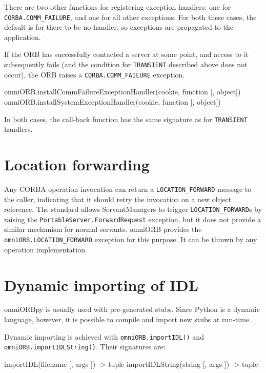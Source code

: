 \documentclass[11pt,oneside,a4paper]{book}
\newcommand{\code}[1]{\texttt{#1}}
\newcommand{\op}[1]{\texttt{#1()}}
\newcommand{\dsc}{\discretionary{}{}{}}
\begin{document}
There are two other functions for registering exception handlers: one
for \code{CORBA.\dsc{}COMM\_FAILURE}, and one for all other
exceptions. For both these cases, the default is for there to be no
handler, so exceptions are propagated to the application.

If the ORB has successfully contacted a server at some point, and
access to it subsequently fails (and the condition for
\code{TRANSIENT} described above does not occur), the ORB raises a
\code{CORBA.COMM\_\dsc{}FAILURE} exception.

\begin{pylisting}
omniORB.installCommFailureExceptionHandler(cookie, function [, object])
omniORB.installSystemExceptionHandler(cookie, function [, object])
\end{pylisting}

\noindent In both cases, the call-back function has the same signature
as for \code{TRANSIENT} handlers.



\section{Location forwarding}
\label{sec:locationForward}

Any CORBA operation invocation can return a \code{LOCATION\_FORWARD}
message to the caller, indicating that it should retry the invocation
on a new object reference. The standard allows ServantManagers to
trigger \code{LOCATION\_FORWARD}s by raising the
\code{PortableServer.ForwardRequest} exception, but it does not
provide a similar mechanism for normal servants. omniORB provides the
\code{omniORB.\dsc{}LOCATION\_FORWARD} exception for this purpose. It
can be thrown by any operation implementation.



\section{Dynamic importing of IDL}
\label{sec:importIDL}

omniORBpy is usually used with pre-generated stubs. Since Python is a
dynamic language, however, it is possible to compile and import new
stubs at run-time.

Dynamic importing is achieved with \op{omniORB.importIDL} and
\op{omniORB.\dsc{}importIDLString}. Their signatures are:

\begin{pylisting}
importIDL(filename [, args ]) -> tuple
importIDLString(string [, args ]) -> tuple
\end{pylisting}
\end{document}
